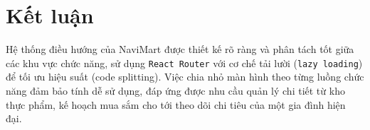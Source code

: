\documentclass[12pt,a4paper]{article}
\newcommand{\code}[1]{\texttt{#1}}
\begin{document}
\section{Kết luận}

Hệ thống điều hướng của NaviMart được thiết kế rõ ràng và phân tách tốt giữa các khu vực chức năng, sử dụng \code{React Router} với cơ chế tải lười (\code{lazy loading}) để tối ưu hiệu suất (code splitting). Việc chia nhỏ màn hình theo từng luồng chức năng đảm bảo tính dễ sử dụng, đáp ứng được nhu cầu quản lý chi tiết từ kho thực phẩm, kế hoạch mua sắm cho tới theo dõi chi tiêu của một gia đình hiện đại.
\end{document}
